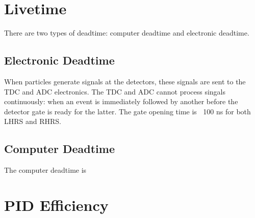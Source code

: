 %
%

\section{Livetime}
There are two types of deadtime: computer deadtime and electronic deadtime.

\subsection{Electronic Deadtime}
When particles generate signals at the detectors, these signals are sent to the TDC and ADC electronics.
The TDC and ADC cannot process singals continuously: when an event is immediately followed by another
before the detector gate is ready for the latter. The gate opening time is $~$ 100 ns for both LHRS and RHRS.



\subsection{Computer Deadtime}
The computer deadtime is

\section{PID Efficiency}


